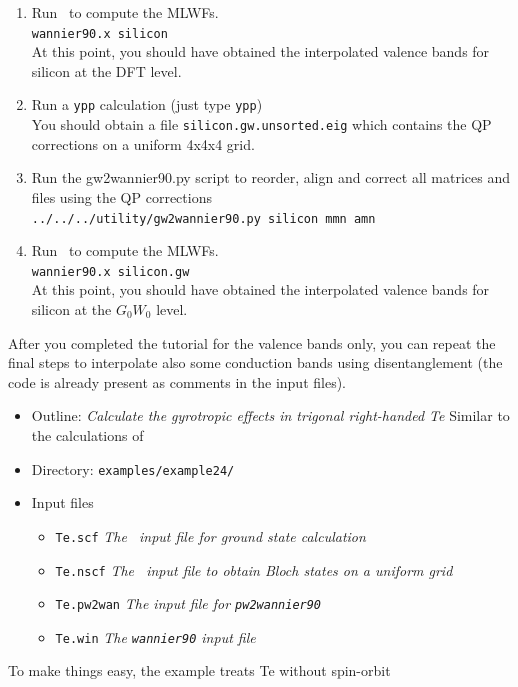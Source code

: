 \documentclass[a4paper,11pt,twoside]{article}
\begin{document}
\begin{enumerate}
\item Run \wannier\ to compute the MLWFs.\\
{\tt wannier90.x silicon}\\
At this point, you should have obtained the interpolated valence bands for silicon at the DFT level.
\item Run a {\tt ypp} calculation (just type {\tt ypp})\\
You should obtain a file {\tt silicon.gw.unsorted.eig} which contains the QP corrections on a uniform 4x4x4 grid.
\item Run the gw2wannier90.py script to reorder, align and correct all matrices and files using the QP corrections\\
{\tt ../../../utility/gw2wannier90.py silicon mmn amn}
\item Run \wannier\ to compute the MLWFs.\\
{\tt wannier90.x silicon.gw}\\
At this point, you should have obtained the interpolated valence bands for silicon at the $G_0W_0$ level.
\end{enumerate}
After you completed the tutorial for the valence bands only, you can repeat the final steps to interpolate also some conduction bands using disentanglement (the code is already present as comments in the input files).




\begin{itemize}
\item{Outline: {\it Calculate the gyrotropic effects in trigonal right-handed Te} Similar to the calculations of \cite{tsirkin-arxiv17}}
\item{Directory: {\tt examples/example24/}}
\item{Input files}
\begin{itemize}
\item{ {\tt Te.scf} {\it The \pwscf\ input file for ground state
    calculation}}
\item{ {\tt Te.nscf}  {\it The \pwscf\ input file to obtain Bloch
    states on a uniform grid}} 
\item{ {\tt Te.pw2wan}  {\it The input file for {\tt pw2wannier90}}}
\item{ {\tt Te.win} {\it The {\tt wannier90} input
      file}}
\end{itemize}
\end{itemize}

To make things easy, the example treats Te without spin-orbit
\end{document}
